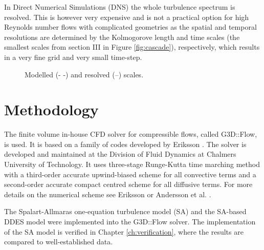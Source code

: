 In Direct Numerical Simulations (DNS) the whole turbulence spectrum is resolved. This is however very expensive and is not a practical option for high Reynolds number flows with complicated geometries as the spatial and temporal resolutions are determined by the Kolmogorove length and time scales (the smallest scales from section III in Figure \ref{fig:cascade}), respectively, which results in a very fine grid and very small time-step. 
\begin{figure}[h]
  \centering
{}
  \caption{Modelled (- -) and resolved (--) scales.}\label{fig:Scales}
\end{figure}





%
%
%
\chapter{Methodology\label{ch:NM}}
The finite volume in-house CFD solver for compressible flows, called G3D::Flow, is used. It is based on a family of codes developed by Eriksson \cite{g3dflow}. The solver is developed and maintained at the Division of Fluid Dynamics at Chalmers University of Technology. It uses three-stage Runge-Kutta time marching method with a third-order accurate upwind-biased scheme for all convective terms and a second-order accurate compact centred scheme for all diffusive terms. For more details on the numerical scheme see Eriksson \cite{g3dflow} or Andersson et al. \cite{g3dflowNA}.

The Spalart-Allmaras one-equation turbulence model (SA) and the SA-based DDES model were implemented into the G3D::Flow solver. The implementation of the SA model is verified in Chapter \ref{ch:verification}, where the results are compared to well-established data. 
